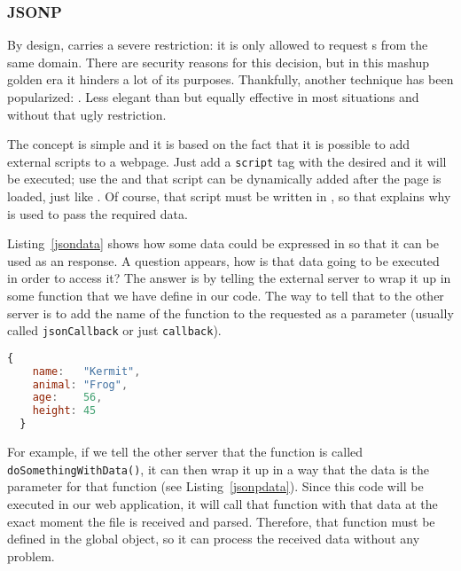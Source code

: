 
\subsubsection{JSONP} %
\label{ssub:jsonp}

By design,  carries a severe restriction: it is only allowed to request s from the same domain.
There are security reasons for this decision, but in this mashup golden era it hinders a lot of its purposes.
Thankfully, another technique has been popularized: .
Less elegant than  but equally effective in most situations and without that ugly restriction.

The concept is simple and it is based on the fact that it is possible to add external scripts to a webpage.
Just add a \texttt{script} tag with the desired  and it will be executed; use the  and that script can be dynamically added after the page is loaded, just like .
Of course, that script must be written in , so that explains why   is used to pass the required data.

Listing~\vref{jsondata} shows how some data could be expressed in  so that it can be used as an  response.
A question appears, how is that data going to be executed in order to access it?
The answer is by telling the external server to wrap it up in some function that we have define in our  code.
The way to tell that to the other server is to add the name of the function to the requested  as a parameter (usually called \texttt{jsonCallback} or just \texttt{callback}).

\begin{lstlisting}[language=JavaScript,label=jsondata,caption=Some JSON data]
  {
    name:   "Kermit",
    animal: "Frog",
    age:    56,
    height: 45
  }
\end{lstlisting}

For example, if we tell the other server that the function is called \texttt{doSomethingWithData()}, it can then wrap it up in a way that the data is the parameter for that function (see Listing~\vref{jsonpdata}).
Since this code will be executed in our web application, it will call that function with that data at the exact moment the file is received and parsed.
Therefore, that function must be defined in the global object, so it can process the received data without any problem.

